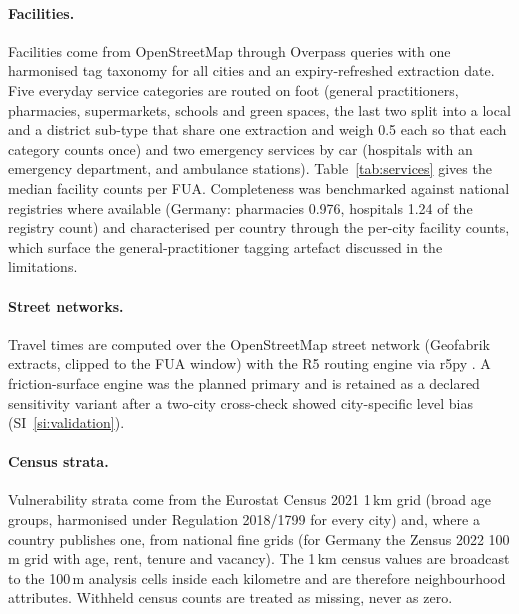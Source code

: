 \documentclass[11pt]{article}
\begin{document}
\paragraph{Facilities.} Facilities come from OpenStreetMap through Overpass
queries with one harmonised tag taxonomy for all cities and an
expiry-refreshed extraction date. Five everyday service categories are
routed on foot (general practitioners, pharmacies, supermarkets, schools
and green spaces, the last two split into a local and a district sub-type
that share one extraction and weigh 0.5 each so that each category counts
once) and two emergency services by car (hospitals with an emergency
department, and ambulance stations). Table~\ref{tab:services} gives the
median facility counts per FUA. Completeness was benchmarked against
national registries where available (Germany: pharmacies 0.976, hospitals
1.24 of the registry count) and characterised per country through the
per-city facility counts, which surface the general-practitioner tagging
artefact discussed in the limitations.

\paragraph{Street networks.} Travel times are computed over the
OpenStreetMap street network (Geofabrik extracts, clipped to the FUA
window) with the R5 routing engine via r5py \citep{fink2022r5py}. A
friction-surface engine \citep{weiss2020healthcare} was the planned
primary and is retained as a declared sensitivity variant after a
two-city cross-check showed city-specific level bias (SI~\ref{si:validation}).

\paragraph{Census strata.} Vulnerability strata come from the Eurostat
Census 2021 1\,km grid (broad age groups, harmonised under Regulation
2018/1799 for every city) and, where a country publishes one, from national
fine grids (for Germany the Zensus 2022 100\,m grid with age, rent, tenure
and vacancy). The 1\,km census values are broadcast to the 100\,m analysis
cells inside each kilometre and are therefore neighbourhood attributes.
Withheld census counts are treated as missing, never as zero.
\end{document}

